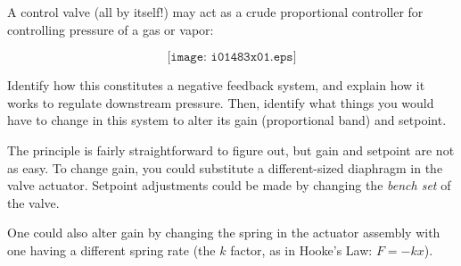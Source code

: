 

A control valve (all by itself!) may act as a crude proportional controller for controlling pressure of a gas or vapor:

$$\texttt{[image: i01483x01.eps]}$$

Identify how this constitutes a negative feedback system, and explain how it works to regulate downstream pressure.  Then, identify what things you would have to change in this system to alter its gain (proportional band) and setpoint.







The principle is fairly straightforward to figure out, but gain and setpoint are not as easy.  To change gain, you could substitute a different-sized diaphragm in the valve actuator.  Setpoint adjustments could be made by changing the {\it bench set} of the valve.







One could also alter gain by changing the spring in the actuator assembly with one having a different spring rate (the $k$ factor, as in Hooke's Law: $F = -kx$).




